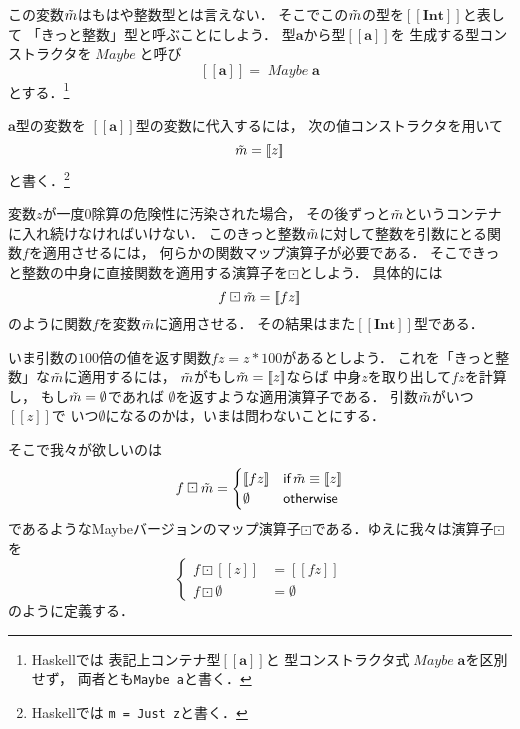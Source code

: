 \documentclass[a5paper,draft]{jsbook}
\def\[{\left[\!\left[}
\def\]{\right]\!\right]}
\newcommand{\programminglanguage}[1]{\textsf{#1}}
\newcommand{\haskell}{\programminglanguage{Haskell}}
\newcommand{\code}[1]{\texttt{#1}}
\newcommand{\mathTypeParameter}[1]{\mathbf{#1}}
\newcommand{\mathTypeName}[1]{\mathbf{#1}}
\newcommand{\mathTypeConstructor}[1]{\mathit{#1}} %
\newcommand{\mathMaybeVar}[1]{\Tilde{#1}}
\newcommand{\mathMaybeWith}[1]{\[#1\]}
\newcommand{\mathMaybeType}[1]{\[#1\]}
\DeclareMathOperator{\mathMaybe}{\mathTypeConstructor{Maybe}}
\newcommand{\mathNothing}{\emptyset}
\newcommand{\mathMaybeMap}{\mathbin{\boxdot}}
\newcommand{\mathKeyword}[1]{\operatorname{\textsf{#1}}}
\newcommand{\mathIf}{\mathKeyword{if}}
\newcommand{\mathOtherwise}{\mathKeyword{otherwise}}
\begin{document}
この変数$\mathMaybeVar{m}$はもはや整数型とは言えない．
そこでこの$\mathMaybeVar{m}$の型を$\mathMaybeType{\mathTypeName{Int}}$と表して
「きっと整数」型と呼ぶことにしよう．
型$\mathTypeParameter{a}$から型$\mathMaybeType{\mathTypeParameter{a}}$を
生成する型コンストラクタを$\mathMaybe$と呼び
$$
\mathMaybeType{\mathTypeParameter{a}}
=\mathMaybe\mathTypeParameter{a}
$$
とする．\footnote{\haskell では
表記上コンテナ型$\mathMaybeType{\mathTypeParameter{a}}$と
型コンストラクタ式$\mathMaybe\mathTypeParameter{a}$を区別せず，
両者とも\code{Maybe a}と書く．}

$\mathTypeParameter{a}$型の変数を
$\mathMaybeType{\mathTypeParameter{a}}$型の変数に代入するには，
次の値コンストラクタを用いて
$$
\mathMaybeVar{m}=\mathMaybeWith{z}
$$
と書く．\footnote{\haskell では
\code{m = Just z}と書く．}

変数$z$が一度$0$除算の危険性に汚染された場合，
その後ずっと$\mathMaybeVar{m}$というコンテナに入れ続けなければいけない．
このきっと整数$\mathMaybeVar{m}$に対して整数を引数にとる関数$f$を適用させるには，
何らかの関数マップ演算子が必要である．
そこできっと整数の中身に直接関数を適用する演算子を$\mathMaybeMap$としよう．
具体的には
$$
f\mathMaybeMap\mathMaybeVar{m}=\mathMaybeWith{fz}
$$
のように関数$f$を変数$\mathMaybeVar{m}$に適用させる．
その結果はまた$\mathMaybeType{\mathTypeName{Int}}$型である．

いま引数の$100$倍の値を返す関数$fz=z*100$があるとしよう．
これを「きっと整数」な$\mathMaybeVar{m}$に適用するには，
$\mathMaybeVar{m}$がもし$\mathMaybeVar{m}=\mathMaybeWith{z}$ならば
中身$z$を取り出して$fz$を計算し，
もし$\mathMaybeVar{m}=\mathNothing$であれば
$\mathNothing$を返すような適用演算子である．
引数$\mathMaybeVar{m}$がいつ$\mathMaybeWith{z}$で
いつ$\mathNothing$になるのかは，いまは問わないことにする．

そこで我々が欲しいのは
\begin{equation}
f\mathMaybeMap\mathMaybeVar{m}=\begin{cases}
\mathMaybeWith{fz}&\mathIf\mathMaybeVar{m}\equiv\mathMaybeWith{z}\\
\mathNothing&\mathOtherwise
\end{cases}
\end{equation}
であるようなMaybeバージョンのマップ演算子$\mathMaybeMap$である．ゆえに我々は演算子$\mathMaybeMap$を
\begin{equation}
\left\{
\begin{split}
f\mathMaybeMap\mathMaybeWith{z}&=\mathMaybeWith{fz}\\
f\mathMaybeMap\mathNothing&=\mathNothing
\end{split}
\right.
\end{equation}
のように定義する．
\end{document}

